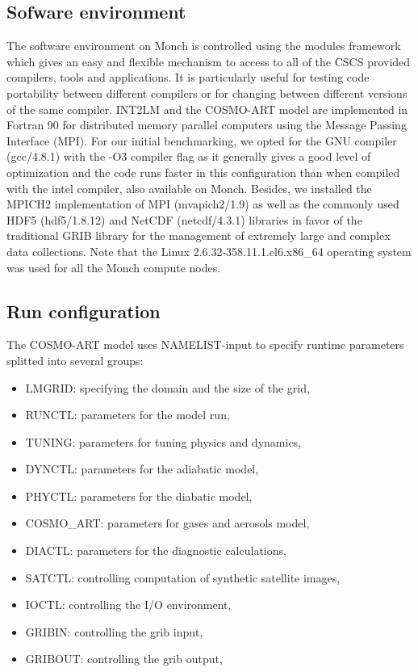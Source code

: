 \subsection{Sofware environment}
\label{subsec:3.1}
The  software environment  on Monch  is controlled  using  the modules
framework which gives an easy  and flexible mechanism to access to all
of  the  CSCS  provided  compilers,  tools and  applications.   It  is
particularly  useful for  testing code  portability  between different
compilers  or for  changing  between different  versions  of the  same
compiler.  INT2LM  and the COSMO-ART model are  implemented in Fortran
90 for distributed memory parallel computers using the Message Passing
Interface (MPI).  For  our initial benchmarking, we opted  for the GNU
compiler (gcc/4.8.1) with the -O3  compiler flag as it generally gives
a  good  level  of optimization  and  the  code  runs faster  in  this
configuration  than  when  compiled  with  the  intel  compiler,  also
available on  Monch.  Besides, we installed  the MPICH2 implementation
of MPI (mvapich2/1.9) as well  as the commonly used HDF5 (hdf5/1.8.12)
and NetCDF  (netcdf/4.3.1) libraries in favor of  the traditional GRIB
library  for  the  management  of  extremely large  and  complex  data
collections.    Note   that   the  Linux   2.6.32-358.11.1.el6.x86\_64
operating system was used for all the Monch compute nodes.

\subsection{Run configuration}
\label{subsec:3.2}
The COSMO-ART model uses NAMELIST-input to specify runtime parameters
splitted into several groups:

\begin{itemize}
\item LMGRID: specifying the domain and the size of the grid,
\item RUNCTL: parameters for the model run,
\item TUNING: parameters for tuning physics and dynamics,
\item DYNCTL: parameters for the adiabatic model,
\item PHYCTL: parameters for the diabatic model,
\item COSMO\_ART: parameters for gases and aerosols model,
\item DIACTL: parameters for the diagnostic calculations,
\item SATCTL: controlling computation of synthetic satellite images,
\item IOCTL: controlling the I/O environment,
\item GRIBIN: controlling the grib input,
\item GRIBOUT: controlling the grib output,
\end{itemize}

